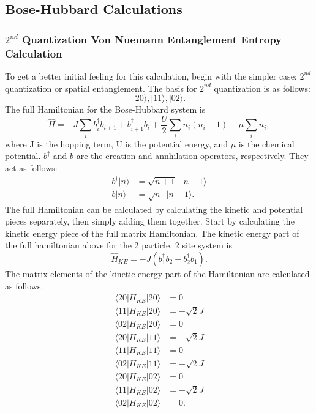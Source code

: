 \subsection{Bose-Hubbard Calculations} \label{calculations}
\subsubsection{$2^{nd}$ Quantization Von Nuemann Entanglement Entropy Calculation}
To get a better initial feeling for this calculation, begin with the simpler case: $2^{nd}$ quantization or spatial entanglement. The basis for $2^{nd}$ quantization is as follows:
\begin{equation}
|2 0 \rangle, |1 1 \rangle, |0 2 \rangle.
\end{equation}
\noindent The full Hamiltonian for the Bose-Hubbard system is
\begin{equation}
\hat{H} = -J\sum_i{b_i^{\dagger}b_{i+1} + b_{i+1}^{\dagger}b_i} + \frac{U}{2}\sum_i{n_i(n_i - 1)} - \mu\sum_i{n_i},
\end{equation}
\noindent where J is the hopping term, U is the potential energy, and $\mu$ is the chemical potential. $b^{\dagger}$ and $b$ are the creation and annhilation operators, respectively. They act as follows:
\begin{align}
b^{\dagger}|n\rangle &= \sqrt{n+1}\enspace|n+1\rangle \\
b|n\rangle &= \sqrt{n}\enspace|n-1\rangle.
\end{align}
\noindent The full Hamiltonian can be calculated by calculating the kinetic and potential pieces separately, then simply adding them together. Start by calculating the kinetic energy piece of the full matrix Hamiltonian. The kinetic energy part of the full hamiltonian above for the 2 particle, 2 site system is
\begin{equation}
\hat{H}_{KE}=-J(b_1^{\dagger}b_2+b_2^{\dagger}b_1).
\end{equation}
\noindent The matrix elements of the kinetic energy part of the Hamiltonian are calculated as follows:
\begin{align*}
\langle{20|H_{KE}|20\rangle} &=0 \\
\langle{11|H_{KE}|20\rangle} &=-\sqrt{2}J \\
\langle{02|H_{KE}|20\rangle} &=0 \\
\langle{20|H_{KE}|11\rangle} &=-\sqrt{2}J \\
\langle{11|H_{KE}|11\rangle} &=0 \\
\langle{02|H_{KE}|11\rangle} &=-\sqrt{2}J \\
\langle{20|H_{KE}|02\rangle} &=0 \\
\langle{11|H_{KE}|02\rangle} &=-\sqrt{2}J \\
\langle{02|H_{KE}|02\rangle} &=0.
\end{align*}
